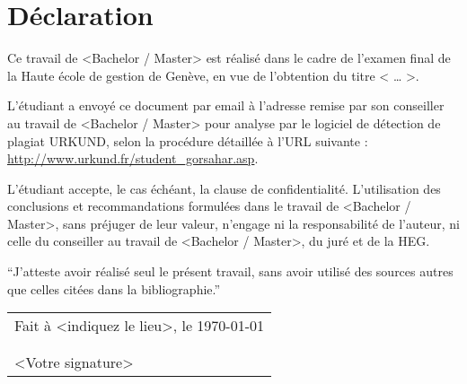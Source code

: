 

\newpage

\section*{Déclaration}		%

Ce travail de <Bachelor / Master> est réalisé dans le cadre de l’examen final de la Haute école de gestion de Genève, en vue de l’obtention du titre < … >.

L’étudiant a envoyé ce document par email à l'adresse remise par son conseiller au travail de <Bachelor / Master> pour analyse par le logiciel de détection de plagiat URKUND, selon la procédure détaillée à l’URL suivante : \url{http://www.urkund.fr/student_gorsahar.asp}.

L’étudiant accepte, le cas échéant, la clause de confidentialité. L'utilisation des conclusions et recommandations formulées dans le travail de <Bachelor / Master>, sans préjuger de leur valeur, n'engage ni la responsabilité de l'auteur, ni celle du conseiller au travail de <Bachelor / Master>, du juré et de la HEG. \bigskip{}


\enquote{J’atteste avoir réalisé seul le présent travail, sans avoir utilisé
des sources autres que celles citées dans la bibliographie.} \vspace{3cm}


\noindent \begin{flushright}
\begin{tabular}{l}
	\makeatletter		%
		Fait à <indiquez le lieu>, le \today{}\tabularnewline
		\@author\tabularnewline
		\tabularnewline
		<Votre signature>		%
	\makeatother
\end{tabular}
\par\end{flushright}


